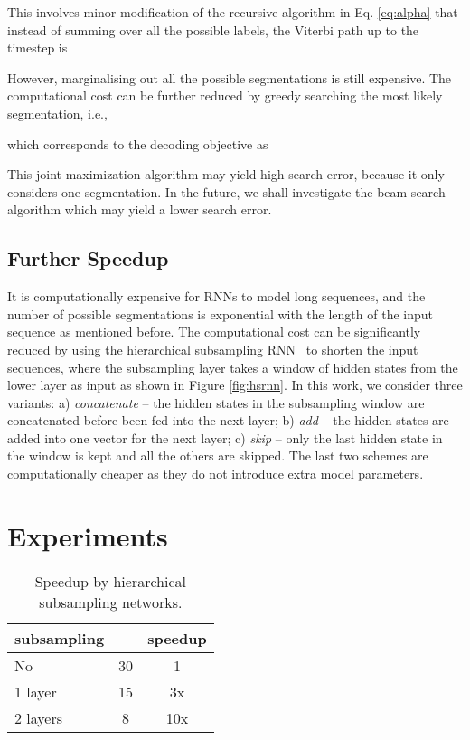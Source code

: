 \documentclass[a4paper]{article}
\begin{document}
This involves minor modification of the recursive algorithm in Eq. \eqref{eq:alpha} that instead of summing over all the possible labels, the Viterbi path up to the timestep  is

However, marginalising out all the possible segmentations is still expensive. The computational cost can be further reduced by greedy searching the most likely segmentation,  i.e.,

which corresponds to the decoding objective as

This joint maximization algorithm may yield high search error, because it only considers one segmentation.  In the future, we shall investigate the beam search algorithm which may yield a lower search error.

\subsection{Further Speedup}
\label{sec:subsample}

It is computationally expensive for RNNs to model long sequences, and the number of possible segmentations is exponential with the length of the input sequence as mentioned before. The computational cost can be significantly reduced by using the hierarchical subsampling RNN~\cite{graves2012hierarchical} to shorten the input sequences, where the subsampling layer takes a window of hidden states from the lower layer as input as shown in Figure \ref{fig:hsrnn}.  In this work, we consider three variants: a) {\it concatenate} -- the hidden states in the subsampling window are concatenated before been fed into the next layer; b) {\it add} -- the hidden states are added into one vector for the next layer; c) {\it skip} -- only the last hidden state in the window is kept and all the others are skipped. The last two schemes are computationally cheaper as they do not introduce extra model parameters. 

\section{Experiments}
\label{sec:exp}


 \begin{table}
 \centering \small
\caption{Speedup by hierarchical subsampling networks. }\vskip 1.5mm

\label{tab:speedup}
\begin{tabular}{l|cc}
\hline

\hline
subsampling   &  &  speedup  \\ \hline
No & 30  & 1 \\
1 layer & 15   & 3x\\
2 layers & 8 & 10x \\

\hline

\hline
\end{tabular}
\vskip-4mm
\end{table}
\end{document}
